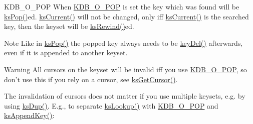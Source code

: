\begin{DoxyParagraph}{K\+D\+B\+\_\+\+O\+\_\+\+P\+O\+P}
When \hyperlink{group__keyset_gga98a3d6a4016c9dad9cbd1a99a9c2a45aa52fb5f2cc86773d393da62bebebf7984}{K\+D\+B\+\_\+\+O\+\_\+\+P\+O\+P} is set the key which was found will be \hyperlink{group__keyset_gae42530b04defb772059de0600159cf69}{ks\+Pop()}ed. \hyperlink{group__keyset_ga4287b9416912c5f2ab9c195cb74fb094}{ks\+Current()} will not be changed, only iff \hyperlink{group__keyset_ga4287b9416912c5f2ab9c195cb74fb094}{ks\+Current()} is the searched key, then the keyset will be \hyperlink{group__keyset_gabe793ff51f1728e3429c84a8a9086b70}{ks\+Rewind()}ed.
\end{DoxyParagraph}
\begin{DoxyNote}{Note}
Like in \hyperlink{group__keyset_gae42530b04defb772059de0600159cf69}{ks\+Pop()} the popped key always needs to be \hyperlink{group__key_ga3df95bbc2494e3e6703ece5639be5bb1}{key\+Del()} afterwards, even if it is appended to another keyset.
\end{DoxyNote}
\begin{DoxyWarning}{Warning}
All cursors on the keyset will be invalid iff you use \hyperlink{group__keyset_gga98a3d6a4016c9dad9cbd1a99a9c2a45aa52fb5f2cc86773d393da62bebebf7984}{K\+D\+B\+\_\+\+O\+\_\+\+P\+O\+P}, so don't use this if you rely on a cursor, see \hyperlink{group__keyset_gaffe507ab9281c322eb16c3e992075d29}{ks\+Get\+Cursor()}.
\end{DoxyWarning}
The invalidation of cursors does not matter if you use multiple keysets, e.\+g. by using \hyperlink{group__keyset_gac59e4b328245463f1451f68d5106151c}{ks\+Dup()}. E.\+g., to separate \hyperlink{group__keyset_gaa34fc43a081e6b01e4120daa6c112004}{ks\+Lookup()} with \hyperlink{group__keyset_gga98a3d6a4016c9dad9cbd1a99a9c2a45aa52fb5f2cc86773d393da62bebebf7984}{K\+D\+B\+\_\+\+O\+\_\+\+P\+O\+P} and \hyperlink{group__keyset_gaa5a1d467a4d71041edce68ea7748ce45}{ks\+Append\+Key()}\+:


